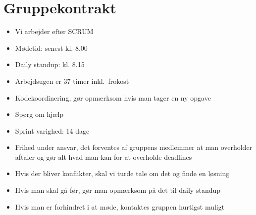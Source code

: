 
\section*{Gruppekontrakt}
\begin{itemize}
    \item Vi arbejder efter SCRUM
    \item Mødetid: senest kl. 8.00
    \item Daily standup: kl. 8.15
    \item Arbejdsugen er 37 timer inkl.\ frokost
    \item Kodekoordinering, gør opmærksom hvis man tager en ny opgave
    \item Spørg om hjælp
    \item Sprint varighed: 14 dage
    \item Frihed under ansvar, det forventes af gruppens medlemmer at man overholder aftaler og gør alt hvad man kan for at overholde deadlines
    \item Hvis der bliver konflikter, skal vi turde tale om det og finde en løsning
    \item Hvis man skal gå før, gør man opmærksom på det til daily standup
    \item Hvis man er forhindret i at møde, kontaktes gruppen hurtigst muligt
\end{itemize}


